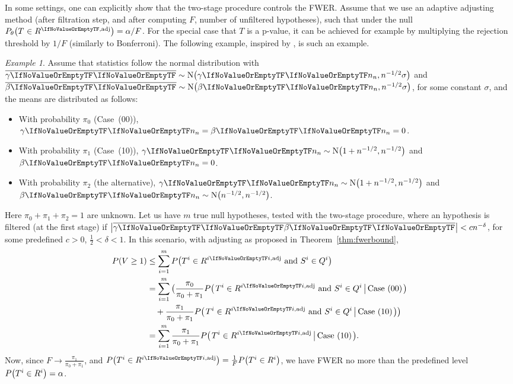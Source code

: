 \documentclass[ejs, twoside]{imsart}
\theoremstyle{plain}
\theoremstyle{remark}
\newtheorem{example}[theorem]{Example}
\newcommand{\andtext}{\ \mathrm{and}\ }
\newcommand{\fullstop}{\text{.}}
\newcommand{\estim}[1]{\avg{\regcoef{#1}}}
\newcommand{\nullcase}[1]{(#1)}
\newcommand{\cond}[2]{\left.{#1}\,\middle|\,{#2}\right.}
\numberwithin{equation}{section}
\numberwithin{table}{section}
\numberwithin{figure}{section}
\let\originalleft\left
\let\originalright\right
\renewcommand{\left}{\mathopen{}\mathclose\bgroup\originalleft}
\renewcommand{\right}{\aftergroup\egroup\originalright}
\begin{document}
In some settings, one can explicitly show that the two-stage procedure controls the FWER.
Assume that we use an adaptive adjusting method (after filtration step, and after computing \(F\), number of unfiltered hypotheses), such that under the null \(P_{\theta}\left(\baserejeventadj \right) = \alpha/F \). For the special case that \(T\) is a p-value, it can be achieved for example by multiplying the rejection threshold by \(1/F\) (similarly to Bonferroni).
The following example, inspired by \citet{huang_genome-wide_2019}, is such an example.  
\begin{example}
    Assume that statistics follow the normal distribution with \(\estim{1} \sim \nordist[\regcoef{1}[][n]][n^{-1/2} \sigma]\) and \(\estim{2} \sim \nordist[\regcoef{2}[][n]][n^{-1/2} \sigma]\), for some constant \(\sigma\), and the means are distributed as follows:
    \begin{itemize}
        \item With probability \(\pi_0\) (Case~\nullcase{00}), \(\regcoef{1}[][n] = \regcoef{2}[][n] = 0\).
        \item With probability \(\pi_1\) (Case~\nullcase{10}), \(\regcoef{1}[][n] \sim \nordist[1 + n^{-1/2}][n^{-1/2}]\) and \(\regcoef{2}[][n] = 0\).
        \item With probability \(\pi_2\) (the alternative), \(\regcoef{1}[][n] \sim \nordist[1 + n^{-1/2}][n^{-1/2}]\) and \(\regcoef{2}[][n] \sim \nordist[n^{-1/2}][n^{-1/2}]\).
    \end{itemize}
    Here \(\pi_0 + \pi_1 + \pi_2 = 1\) are unknown. 
    Let us have \(m\) true null hypotheses, tested with the two-stage procedure, where an hypothesis is filtered (at the first stage) if \(\left|\estim{1} \estim{2}\right| < cn^{-\delta}\), for some predefined \(c > 0\), \(\frac{1}{2} < \delta < 1\).
    In this scenario, with adjusting as proposed in Theorem~\ref{thm:fwerbound},
    \begin{align*}
        P\left( V \geq 1 \right)
        &\leq \sum_{i=1}^{m} P\left( \baserejeventadj[i] \andtext \nfilevent[i]  \right) \\
        &= \sum_{i=1}^{m} \big(\frac{\pi_0}{\pi_0 + \pi_1} P\left( \cond{\baserejeventadj[i] \andtext \nfilevent[i]}{\text{Case~\nullcase{00}}} \right) \\
        &\quad+ \frac{\pi_1}{\pi_0 + \pi_1} P\left( \cond{\baserejeventadj[i] \andtext \nfilevent[i]}{\text{Case~\nullcase{10}}} \right) \big)\\
        &= \sum_{i=1}^{m} \frac{\pi_1}{\pi_0 + \pi_1} P\left( \cond{\baserejeventadj[i]}{\text{Case~\nullcase{10}}} \right) \fullstop
    \end{align*}
    Now, since \(F \to \frac{\pi_1}{\pi_0 + \pi_1}\), and \(P\left( \baserejeventadj[i]\right) = \frac{1}{F} P\left( \baserejevent[i]\right) \), we have FWER no more than the predefined level \(P\left( \baserejevent[i]\right) = \alpha\).
\end{example}
\end{document}
